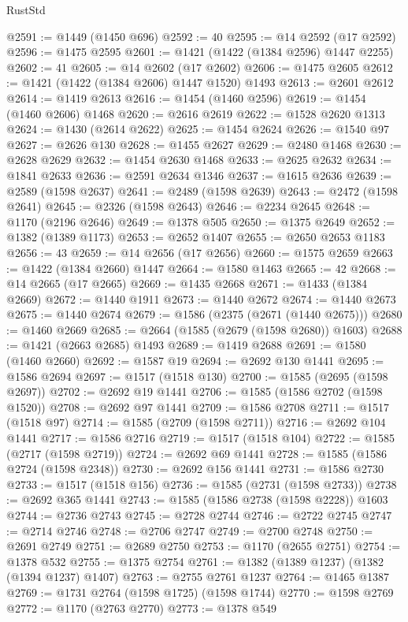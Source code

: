 \begin{lexlean}{RustStd}
\begin{coremodule}
@2591 := @1449 (@1450 @696)
@2592 := 40
@2595 := @14 @2592 (@17 @2592)
@2596 := @1475 @2595
@2601 := @1421 (@1422 (@1384 @2596) @1447 @2255)
@2602 := 41
@2605 := @14 @2602 (@17 @2602)
@2606 := @1475 @2605
@2612 := @1421 (@1422 (@1384 @2606) @1447 @1520) @1493
@2613 := @2601 @2612
@2614 := @1419 @2613
@2616 := @1454 (@1460 @2596)
@2619 := @1454 (@1460 @2606) @1468
@2620 := @2616 @2619
@2622 := @1528 @2620 @1313
@2624 := @1430 (@2614 @2622)
@2625 := @1454 @2624
@2626 := @1540 @97
@2627 := @2626 @130
@2628 := @1455 @2627
@2629 := @2480 @1468
@2630 := @2628 @2629
@2632 := @1454 @2630 @1468
@2633 := @2625 @2632
@2634 := @1841 @2633
@2636 := @2591 @2634 @1346
@2637 := @1615 @2636
@2639 := @2589 (@1598 @2637)
@2641 := @2489 (@1598 @2639)
@2643 := @2472 (@1598 @2641)
@2645 := @2326 (@1598 @2643)
@2646 := @2234 @2645
@2648 := @1170 (@2196 @2646)
@2649 := @1378 @505
@2650 := @1375 @2649
@2652 := @1382 (@1389 @1173)
@2653 := @2652 @1407
@2655 := @2650 @2653 @1183
@2656 := 43
@2659 := @14 @2656 (@17 @2656)
@2660 := @1575 @2659
@2663 := @1422 (@1384 @2660) @1447
@2664 := @1580 @1463
@2665 := 42
@2668 := @14 @2665 (@17 @2665)
@2669 := @1435 @2668
@2671 := @1433 (@1384 @2669)
@2672 := @1440 @1911
@2673 := @1440 @2672
@2674 := @1440 @2673
@2675 := @1440 @2674
@2679 := @1586 (@2375 (@2671 (@1440 @2675)))
@2680 := @1460 @2669
@2685 := @2664 (@1585 (@2679 (@1598 @2680)) @1603)
@2688 := @1421 (@2663 @2685) @1493
@2689 := @1419 @2688
@2691 := @1580 (@1460 @2660)
@2692 := @1587 @19
@2694 := @2692 @130 @1441
@2695 := @1586 @2694
@2697 := @1517 (@1518 @130)
@2700 := @1585 (@2695 (@1598 @2697))
@2702 := @2692 @19 @1441
@2706 := @1585 (@1586 @2702 (@1598 @1520))
@2708 := @2692 @97 @1441
@2709 := @1586 @2708
@2711 := @1517 (@1518 @97)
@2714 := @1585 (@2709 (@1598 @2711))
@2716 := @2692 @104 @1441
@2717 := @1586 @2716
@2719 := @1517 (@1518 @104)
@2722 := @1585 (@2717 (@1598 @2719))
@2724 := @2692 @69 @1441
@2728 := @1585 (@1586 @2724 (@1598 @2348))
@2730 := @2692 @156 @1441
@2731 := @1586 @2730
@2733 := @1517 (@1518 @156)
@2736 := @1585 (@2731 (@1598 @2733))
@2738 := @2692 @365 @1441
@2743 := @1585 (@1586 @2738 (@1598 @2228)) @1603
@2744 := @2736 @2743
@2745 := @2728 @2744
@2746 := @2722 @2745
@2747 := @2714 @2746
@2748 := @2706 @2747
@2749 := @2700 @2748
@2750 := @2691 @2749
@2751 := @2689 @2750
@2753 := @1170 (@2655 @2751)
@2754 := @1378 @532
@2755 := @1375 @2754
@2761 := @1382 (@1389 @1237) (@1382 (@1394 @1237) @1407)
@2763 := @2755 @2761 @1237
@2764 := @1465 @1387
@2769 := @1731 @2764 (@1598 @1725) (@1598 @1744)
@2770 := @1598 @2769
@2772 := @1170 (@2763 @2770)
@2773 := @1378 @549

\end{coremodule}
\end{lexlean}
